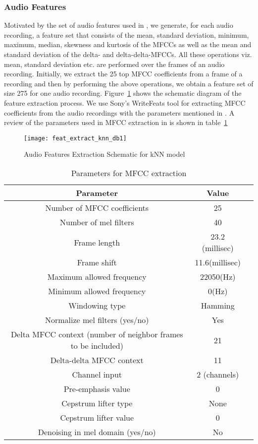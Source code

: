 \subsubsection{Audio Features}
Motivated by the set of audio features used in \cite{salamon2014dataset}, we generate, for each audio recording, a feature set that consists of the mean, standard deviation, minimum, maximum, median, skewness and kurtosis of the MFCCs as well as the mean and standard deviation of the delta- and delta-delta-MFCCs. All these operations viz. mean, standard deviation etc. are performed over the frames of an audio recording. Initially, we extract the 25 top MFCC coefficients from a frame of a recording and then by performing the above operations, we obtain a feature set of size 275 for one audio recording. Figure~\ref{fig:feat_extract_knn_db1} shows the schematic diagram of the feature extraction process. We use Sony's WriteFeats tool for extracting MFCC coefficients from the audio recordings with the parameters mentioned in \cite{salamon2014dataset}. A review of the parameters used in MFCC extraction in  is shown in table~\ref{tab:param_mfcc_knn_db1}

\begin{figure}[!htb] 
\centering 
\texttt{[image: feat\_extract\_knn\_db1]}
\caption[Audio Features Extraction Schematic for kNN model]{Audio Features Extraction Schematic for kNN model}
\label{fig:feat_extract_knn_db1} 
\end{figure}

\begin{table}[tb]
\caption[Parameters for MFCC extraction]{Parameters for MFCC extraction}
\label{tab:param_mfcc_knn_db1}
\centering
\begin{tabular}{ccc}
\toprule
Parameter & Value \\
\midrule
Number of MFCC coefficients	& 25\\
Number of mel filters	& 40\\
Frame length & 23.2 (millisec)\\
Frame shift 	& 11.6(millisec)\\
Maximum allowed frequency & 22050(Hz)\\
Minimum allowed frequency & 0(Hz)\\
Windowing type & Hamming\\
Normalize mel filters (yes/no) & Yes \\
Delta MFCC context (number of neighbor frames to be included) & 21 \\
Delta-delta MFCC context & 11 \\
Channel input & 2 (channels) \\
Pre-emphasis value & 0 \\
Cepstrum lifter type & None \\
Cepstrum lifter value & 0 \\
Denoising in mel domain (yes/no) & No \\
\bottomrule 
\end{tabular}
\end{table}

